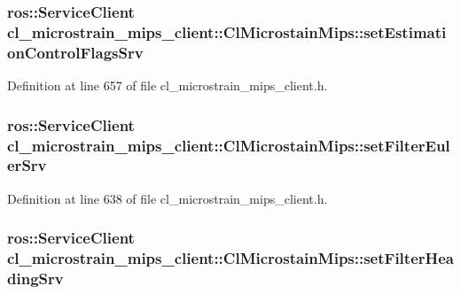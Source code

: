 \subsubsection[{\texorpdfstring{set\+Estimation\+Control\+Flags\+Srv}{setEstimationControlFlagsSrv}}]{\setlength{\rightskip}{0pt plus 5cm}ros\+::\+Service\+Client cl\+\_\+microstrain\+\_\+mips\+\_\+client\+::\+Cl\+Microstain\+Mips\+::set\+Estimation\+Control\+Flags\+Srv\hspace{0.3cm}{\ttfamily [protected]}}\hypertarget{classcl__microstrain__mips__client_1_1ClMicrostainMips_a1b440add6a87fd740f5b8f5bbf00fb03}{}\label{classcl__microstrain__mips__client_1_1ClMicrostainMips_a1b440add6a87fd740f5b8f5bbf00fb03}


Definition at line 657 of file cl\+\_\+microstrain\+\_\+mips\+\_\+client.\+h.

\subsubsection[{\texorpdfstring{set\+Filter\+Euler\+Srv}{setFilterEulerSrv}}]{\setlength{\rightskip}{0pt plus 5cm}ros\+::\+Service\+Client cl\+\_\+microstrain\+\_\+mips\+\_\+client\+::\+Cl\+Microstain\+Mips\+::set\+Filter\+Euler\+Srv\hspace{0.3cm}{\ttfamily [protected]}}\hypertarget{classcl__microstrain__mips__client_1_1ClMicrostainMips_a0103ee9a366927018fa5afcddd9ed977}{}\label{classcl__microstrain__mips__client_1_1ClMicrostainMips_a0103ee9a366927018fa5afcddd9ed977}


Definition at line 638 of file cl\+\_\+microstrain\+\_\+mips\+\_\+client.\+h.

\subsubsection[{\texorpdfstring{set\+Filter\+Heading\+Srv}{setFilterHeadingSrv}}]{\setlength{\rightskip}{0pt plus 5cm}ros\+::\+Service\+Client cl\+\_\+microstrain\+\_\+mips\+\_\+client\+::\+Cl\+Microstain\+Mips\+::set\+Filter\+Heading\+Srv\hspace{0.3cm}{\ttfamily [protected]}}\hypertarget{classcl__microstrain__mips__client_1_1ClMicrostainMips_a23f9cbec5a5f86c3ca9fb4781dbf198b}{}\label{classcl__microstrain__mips__client_1_1ClMicrostainMips_a23f9cbec5a5f86c3ca9fb4781dbf198b}


